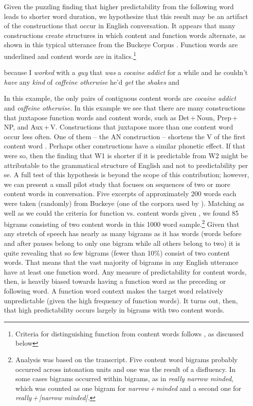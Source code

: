 \documentclass[output=paper]{langscibook}
\begin{document}
Given the puzzling finding that higher predictability from the following word leads to shorter word duration, we hypothesize that this result may be an artifact of the constructions that occur in English conversation. It appears that many constructions create structures in which content and function words alternate, as shown in this typical utterance from the Buckeye Corpus \citep{PittEtAl2007}. Function words are underlined and content words are in italics.\footnote{Criteria for distinguishing function from content words follows \citet{BellJurafsky2009}, as discussed below}

\ea\label{ex:bybee:1}
because I \textit{worked} with a \textit{guy} that \textit{was} a \textit{cocaine addict} for a while and he couldn't \textit{have} any \textit{kind} of \textit{caffeine otherwise} he'd \textit{get} the \textit{shakes} and
\z

In this example, the only pairs of contiguous content words are \textit{cocaine addict} and \textit{caffeine otherwise.} In this example we see that there are many constructions that juxtapose function words and content words, such as Det\,+\,Noun, Prep\,+\,NP, and Aux\,+\,V. Constructions that juxtapose more than one content word occur less often. One of them -- the AN construction -- shortens the V of the first content word \citep{Morrill2011}. Perhaps other constructions have a similar phonetic effect. If that were so, then the finding that W1 is shorter if it is predictable from W2 might be attributable to the grammatical structure of English and not to predictability per se. A full test of this hypothesis is beyond the scope of this contribution; however, we can present a small pilot study that focuses on sequences of two or more content words in conversation. Five excerpts of approximately 200 words each were taken (randomly) from Buckeye (one of the corpora used by \citealt{BellJurafsky2009}). Matching as well as we could the criteria for function vs. content words given \citet{BellJurafsky2009}, we found 85 bigrams consisting of two content words in this 1000 word sample.\footnote{Analysis was based on the transcript. Five content word bigrams probably occurred across intonation units and one was the result of a disfluency. In some cases bigrams occurred within bigrams, as in \textit{really narrow minded}, which was counted as one bigram for \textit{narrow\,+\,minded} and a second one for \textit{really\,+\,[narrow minded].}} Given that any stretch of speech has nearly as many bigrams as it has words (words before and after pauses belong to only one bigram while all others belong to two) it is quite revealing that so few bigrams (fewer than 10\%) consist of two content words. That means that the vast majority of bigrams in any English utterance have at least one function word. Any measure of predictability for content words, then, is heavily biased towards having a function word as the preceding or following word. A function word context makes the target word relatively unpredictable (given the high frequency of function words). It turns out, then, that high predictability occurs largely in bigrams with two content words.
\end{document}
